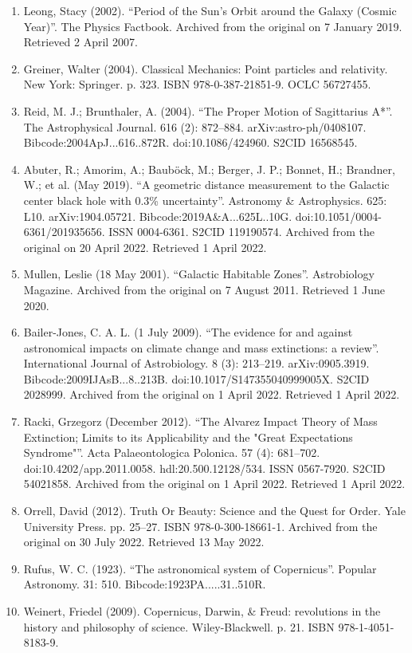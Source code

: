 \begin{enumerate}
\item Leong, Stacy (2002). ``Period of the Sun's Orbit around the Galaxy (Cosmic Year)''. The Physics Factbook. Archived from the original on 7 January 2019. Retrieved 2 April 2007.
\item Greiner, Walter (2004). Classical Mechanics: Point particles and relativity. New York: Springer. p. 323. ISBN 978-0-387-21851-9. OCLC 56727455.
\item Reid, M. J.; Brunthaler, A. (2004). ``The Proper Motion of Sagittarius A*''. The Astrophysical Journal. 616 (2): 872–884. arXiv:astro-ph/0408107. Bibcode:2004ApJ...616..872R. doi:10.1086/424960. S2CID 16568545.
\item Abuter, R.; Amorim, A.; Bauböck, M.; Berger, J. P.; Bonnet, H.; Brandner, W.; et al. (May 2019). ``A geometric distance measurement to the Galactic center black hole with 0.3\% uncertainty''. Astronomy \& Astrophysics. 625: L10. arXiv:1904.05721. Bibcode:2019A\&A...625L..10G. doi:10.1051/0004-6361/201935656. ISSN 0004-6361. S2CID 119190574. Archived from the original on 20 April 2022. Retrieved 1 April 2022.
\item Mullen, Leslie (18 May 2001). ``Galactic Habitable Zones''. Astrobiology Magazine. Archived from the original on 7 August 2011. Retrieved 1 June 2020.
\item Bailer-Jones, C. A. L. (1 July 2009). ``The evidence for and against astronomical impacts on climate change and mass extinctions: a review''. International Journal of Astrobiology. 8 (3): 213–219. arXiv:0905.3919. Bibcode:2009IJAsB...8..213B. doi:10.1017/S147355040999005X. S2CID 2028999. Archived from the original on 1 April 2022. Retrieved 1 April 2022.
\item Racki, Grzegorz (December 2012). ``The Alvarez Impact Theory of Mass Extinction; Limits to its Applicability and the "Great Expectations Syndrome"''. Acta Palaeontologica Polonica. 57 (4): 681–702. doi:10.4202/app.2011.0058. hdl:20.500.12128/534. ISSN 0567-7920. S2CID 54021858. Archived from the original on 1 April 2022. Retrieved 1 April 2022.
\item Orrell, David (2012). Truth Or Beauty: Science and the Quest for Order. Yale University Press. pp. 25–27. ISBN 978-0-300-18661-1. Archived from the original on 30 July 2022. Retrieved 13 May 2022.
\item Rufus, W. C. (1923). ``The astronomical system of Copernicus''. Popular Astronomy. 31: 510. Bibcode:1923PA.....31..510R.
\item Weinert, Friedel (2009). Copernicus, Darwin, \& Freud: revolutions in the history and philosophy of science. Wiley-Blackwell. p. 21. ISBN 978-1-4051-8183-9.

\end{enumerate}
